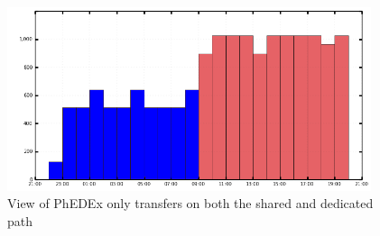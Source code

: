 \begin{figure}[h]
  \centering
  \includegraphics[width=0.95\textwidth]{Figures/FileDownload_PhEDEx_all_paths.png}
  \caption{View of PhEDEx only transfers on both the shared and dedicated path}
  \label{fig:combined_phedex_transfers}
\end{figure} 